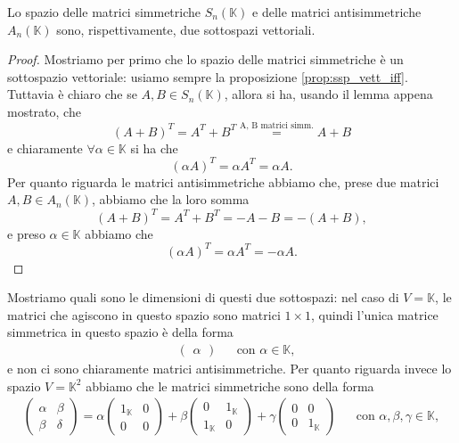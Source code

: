 \begin{prop}
  Lo spazio delle matrici simmetriche $S_n(\mathbb{K})$ e delle matrici antisimmetriche $A_n(\mathbb{K})$ sono, rispettivamente, due sottospazi vettoriali.
\end{prop}
\begin{proof}
  Mostriamo per primo che lo spazio delle matrici simmetriche è un sottospazio vettoriale: usiamo sempre la proposizione \ref{prop:ssp_vett_iff}. Tuttavia è chiaro che se $A, B \in S_n(\mathbb{K})$, allora si ha, usando il lemma appena mostrato, che
  $$
    (A + B)^T = A^T + B^T \stackrel{\text{A, B matrici simm.}}{=} A + B
  $$
  e chiaramente $\forall \alpha \in \mathbb{K}$ si ha che
  $$
    (\alpha A)^T = \alpha A^T = \alpha A.
  $$
  Per quanto riguarda le matrici antisimmetriche abbiamo che, prese due matrici $A, B \in A_n(\mathbb{K})$, abbiamo che la loro somma
  $$
    (A + B)^T = A^T + B^T = - A - B = -(A+B),
  $$
  e preso $\alpha \in \mathbb{K}$ abbiamo che
  $$
    (\alpha A)^T = \alpha A^T = - \alpha A.
  $$
\end{proof}
Mostriamo quali sono le dimensioni di questi due sottospazi: nel caso di $V = \mathbb{K}$, le matrici che agiscono in questo spazio sono matrici $1 \times 1$, quindi l'unica matrice simmetrica in questo spazio è della forma
\begin{align}
  &\begin{pmatrix}
    \alpha
  \end{pmatrix} & &\text{con } \alpha \in \mathbb{K},
\end{align}
e non ci sono chiaramente matrici antisimmetriche. Per quanto riguarda invece lo spazio $V = \mathbb{K}^2$ abbiamo che le matrici simmetriche sono della forma
\begin{align}
  \begin{pmatrix}
    \alpha & \beta \\
    \beta & \delta
  \end{pmatrix} = \alpha \begin{pmatrix}
    1_{\mathbb{K}} & 0 \\
    0 & 0 
  \end{pmatrix} + \beta \begin{pmatrix}
    0 & 1_{\mathbb{K}} \\
    1_{\mathbb{K}} & 0
  \end{pmatrix} + \gamma \begin{pmatrix}
    0 & 0 \\
    0 & 1_\mathbb{K}
  \end{pmatrix} & &\text{con } \alpha, \beta, \gamma \in \mathbb{K},
\end{align}
